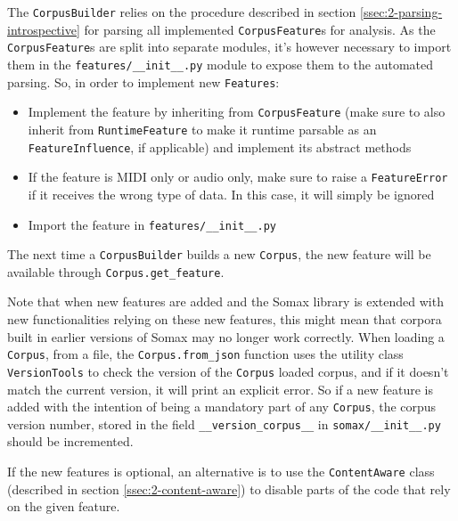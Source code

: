 The \texttt{CorpusBuilder} relies on the procedure described in section \ref{ssec:2-parsing-introspective} for parsing all implemented \texttt{CorpusFeature}s for analysis. As the \texttt{CorpusFeature}s are split into separate modules, it's however necessary to import them in the \texttt{features/\_\_init\_\_.py} module to expose them to the automated parsing. So, in order to implement new \texttt{Features}:

\begin{itemize}
	\item Implement the feature by inheriting from \texttt{CorpusFeature} (make sure to also inherit from \texttt{RuntimeFeature} to make it runtime parsable as an \texttt{FeatureInfluence}, if applicable) and implement its abstract methods
	\item If the feature is MIDI only or audio only, make sure to raise a \texttt{FeatureError} if it receives the wrong type of data. In this case, it will simply be ignored
	\item Import the feature in \texttt{features/\_\_init\_\_.py}
\end{itemize}
The next time a \texttt{CorpusBuilder} builds a new \texttt{Corpus}, the new feature will be available through \texttt{Corpus.get\_feature}.

Note that when new features are added and the Somax library is extended with new functionalities relying on these new features, this might mean that corpora built in earlier versions of Somax may no longer work correctly. When loading a \texttt{Corpus}, from a file, the \texttt{Corpus.from\_json} function uses the utility class \texttt{VersionTools} to check the version of the \texttt{Corpus} loaded corpus, and if it doesn't match the current version, it will print an explicit error. So if a new feature is added with the intention of being a mandatory part of any \texttt{Corpus}, the corpus version number, stored in the field \texttt{\_\_version\_corpus\_\_} in \texttt{somax/\_\_init\_\_.py} should be incremented. 

If the new features is optional, an alternative is to use the \texttt{ContentAware} class (described in section \ref{ssec:2-content-aware}) to disable parts of the code that rely on the given feature.

